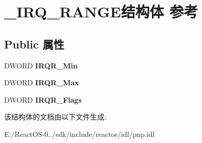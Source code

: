 \hypertarget{struct___i_r_q___r_a_n_g_e}{}\section{\+\_\+\+I\+R\+Q\+\_\+\+R\+A\+N\+G\+E结构体 参考}
\label{struct___i_r_q___r_a_n_g_e}
\subsection*{Public 属性}
\begin{DoxyCompactItemize}
\item 
\mbox{\label{struct___i_r_q___r_a_n_g_e_a0761cbc6be65c93676de32ab82cb1866}} 
D\+W\+O\+RD {\bfseries I\+R\+Q\+R\+\_\+\+Min}
\item 
\mbox{\label{struct___i_r_q___r_a_n_g_e_a48a345300d2d035a6b4478a7e4cb73b1}} 
D\+W\+O\+RD {\bfseries I\+R\+Q\+R\+\_\+\+Max}
\item 
\mbox{\label{struct___i_r_q___r_a_n_g_e_a30cab4403ad916edbffd235939cb92e7}} 
D\+W\+O\+RD {\bfseries I\+R\+Q\+R\+\_\+\+Flags}
\end{DoxyCompactItemize}


该结构体的文档由以下文件生成\+:\begin{DoxyCompactItemize}
\item 
E\+:/\+React\+O\+S-\/0../sdk/include/reactos/idl/pnp.\+idl\end{DoxyCompactItemize}
